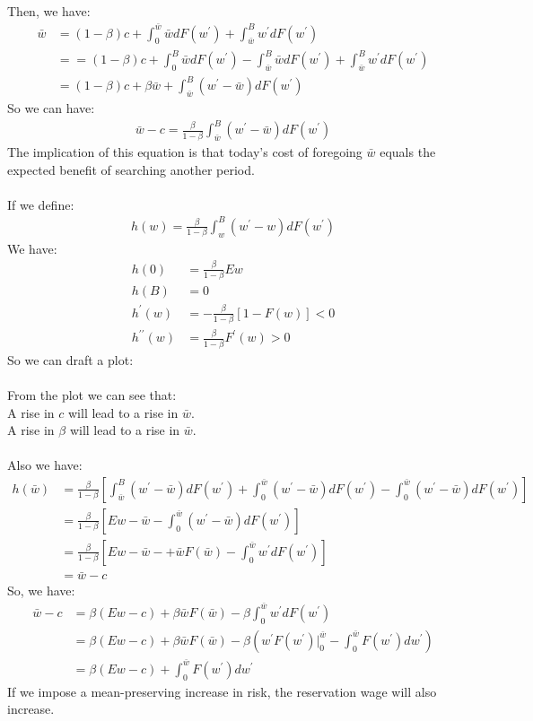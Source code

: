 \documentclass{article}
\begin{document}
Then, we have:
\begin{align*}
	\bar{w} & = (1 -\beta)c + \int^{\bar{w}}_0 \bar{w} dF(w^\prime) + \int^B_{\bar{w}} w^\prime  dF(w^\prime)\\
	& = = (1 -\beta)c + \int^B_0 \bar{w} dF(w^\prime) - \int^B_{\bar{w}} \bar{w} dF(w^\prime) + \int^B_{\bar{w}} w^\prime  dF(w^\prime)\\
	& =  (1 -\beta)c + \beta \bar{w} + \int^B_{\bar{w}} (w^\prime - \bar{w}) dF(w^\prime)
\end{align*}
So we can have:
\begin{align*}
	\bar{w} - c = \frac{\beta}{1 -\beta} \int^B_{\bar{w}} (w^\prime - \bar{w}) dF(w^\prime)
\end{align*}
The implication of this equation is that today's cost of foregoing $\bar{w}$ equals the expected benefit of searching another period.\\\\
If we define:
\begin{align*}
	h(w) = \frac{\beta}{1 -\beta} \int^B_w (w^\prime - w) dF(w^\prime)
\end{align*}
We have:
\begin{align*}
	h(0) &= \frac{\beta}{1 -\beta} Ew\\
	h(B) &= 0\\
	h^\prime(w) &= -\frac{\beta}{1 - \beta}[1 - F(w)] < 0\\
	h^{\prime \prime}(w) &= \frac{\beta}{1 - \beta}F^\prime(w) > 0
\end{align*}
So we can draft a plot:\\\\
From the plot we can see that:\\
\indent A rise in $c$ will lead to a rise in $\bar{w}$.\\
\indent A rise in $\beta$ will lead to a rise in $\bar{w}$.\\\\
Also we have:
\begin{align*}
	h(\bar{w}) &= \frac{\beta}{1 - \beta}[\int^B_{\bar{w}} (w^\prime - \bar{w}) dF(w^\prime) + \int^{\bar{w}}_0 (w^\prime - \bar{w}) dF(w^\prime) - \int^{\bar{w}}_0 (w^\prime - \bar{w}) dF(w^\prime)]\\
	&= \frac{\beta}{1 - \beta}[Ew - \bar{w} - \int^{\bar{w}}_0 (w^\prime - \bar{w}) dF(w^\prime)]\\
	&= \frac{\beta}{1 - \beta}[Ew - \bar{w} -  + \bar{w} F(\bar{w}) - \int^{\bar{w}}_0 w^\prime dF(w^\prime)]\\
	&= \bar{w} - c
\end{align*}
So, we have:
\begin{align*}
	\bar{w} - c &= \beta (Ew - c) + \beta \bar{w} F(\bar{w}) - \beta \int^{\bar{w}}_0 w^\prime dF(w^\prime)\\
	&= \beta (Ew - c) + \beta \bar{w} F(\bar{w}) - \beta(w^\prime F(w^\prime)|^{\bar{w}}_0 - \int^{\bar{w}}_0 F(w^\prime) dw^\prime)\\
	&= \beta (Ew - c) + \int^{\bar{w}}_0 F(w^\prime) dw^\prime
\end{align*}
If we impose a mean-preserving increase in risk, the reservation wage will also increase.
\end{document}
